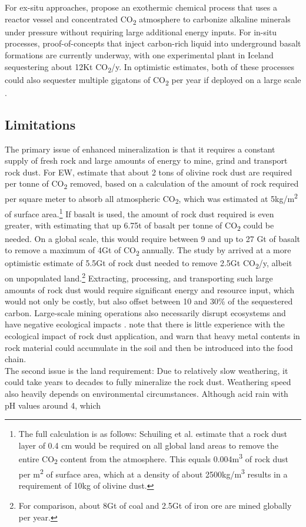 For ex-situ approaches, \textcite{Lackner1997ProgressSubstrates} propose an exothermic chemical process that uses a reactor vessel and concentrated CO\textsubscript{2} atmosphere to carbonize alkaline minerals under pressure without requiring large additional energy inputs. For in-situ processes, proof-of-concepts that inject carbon-rich liquid into underground basalt formations are currently underway, with one experimental plant in Iceland sequestering about 12Kt CO\textsubscript{2}/y. In optimistic estimates, both of these processes could also sequester multiple gigatons of CO\textsubscript{2} per year if deployed on a large scale \parencite{Dipple2021TheSystems}.
\subsection*{Limitations}
The primary issue of enhanced mineralization is that it requires a constant supply of fresh rock and large amounts of energy to mine, grind and transport rock dust. For EW, \textcite{Schuiling2006EnhancedCo2} estimate that about 2 tons of olivine rock dust are required per tonne of CO\textsubscript{2} removed, based on a calculation of the amount of rock required per square meter to absorb all atmospheric CO\textsubscript{2}, which was estimated at 5kg/m\textsuperscript{2} of surface area.\footnote{The full calculation is as follows: Schuiling et al. estimate that a rock dust layer of 0.4 cm would be required on all global land areas to remove the entire CO\textsubscript{2} content from the atmosphere. This equals 0.004m\textsuperscript{3} of rock dust per m\textsuperscript{2} of surface area, which at a density of about 2500kg/m\textsuperscript{3} results in a requirement of 10kg of olivine dust.} If basalt is used, the amount of rock dust required is even greater, with \textcite{Beerling2018FarmingSecurity} estimating that up 6.75t of basalt per tonne of CO\textsubscript{2} could be needed. On a global scale, this would require between 9 and up to 27 Gt of basalt to remove a maximum of 4Gt of CO\textsubscript{2} annually. The study by \textcite{Goll2021PotentialRock} arrived at a more optimistic estimate of 5.5Gt of rock dust needed to remove 2.5Gt CO\textsubscript{2}/y, albeit on unpopulated land.\footnote{For comparison, about 8Gt of coal and 2.5Gt of iron ore are mined globally per year.} Extracting, processing, and transporting such large amounts of rock dust would require significant energy and resource input, which would not only be costly, but also offset between 10 and 30\% of the sequestered carbon. Large-scale mining operations also necessarily disrupt ecosystems and have negative ecological impacts \parencite{Beerling2018FarmingSecurity}. \textcite{Almaraz2022MethodsSettings} note that there is little experience with the ecological impact of rock dust application, and warn that heavy metal contents in rock material could accumulate in the soil and then be introduced into the food chain.\\The second issue is the land requirement: Due to relatively slow weathering, it could take years to decades to fully mineralize the rock dust. Weathering speed also heavily depends on environmental circumstances. Although acid rain with pH values around 4, which 
